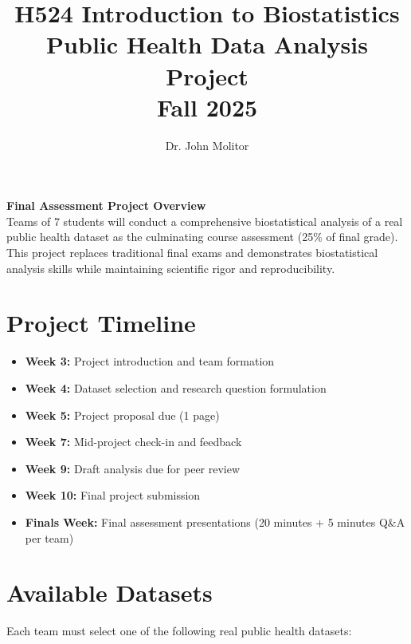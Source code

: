 \documentclass[11pt]{article}
\title{\textbf{H524 Introduction to Biostatistics\\
\Large Public Health Data Analysis Project\\
Fall 2025}}
\author{Dr. John Molitor}
\date{}
\begin{document}
\maketitle

\begin{tcolorbox}[colback=aiblue!10,colframe=aiblue,boxrule=2pt,arc=2pt,left=6pt,right=6pt,top=6pt,bottom=6pt]
\centering
\textbf{\large Final Assessment Project Overview}\\[0.3em]
Teams of 7 students will conduct a comprehensive biostatistical analysis of a real public health dataset as the culminating course assessment (25\% of final grade). This project replaces traditional final exams and demonstrates biostatistical analysis skills while maintaining scientific rigor and reproducibility.
\end{tcolorbox}

\section{Project Timeline}
\begin{itemize}[leftmargin=20pt]
\item \textbf{Week 3:} Project introduction and team formation
\item \textbf{Week 4:} Dataset selection and research question formulation
\item \textbf{Week 5:} Project proposal due (1 page)
\item \textbf{Week 7:} Mid-project check-in and feedback
\item \textbf{Week 9:} Draft analysis due for peer review
\item \textbf{Week 10:} Final project submission
\item \textbf{Finals Week:} Final assessment presentations (20 minutes + 5 minutes Q\&A per team)
\end{itemize}

\section{Available Datasets}

Each team must select one of the following real public health datasets:
\end{document}
